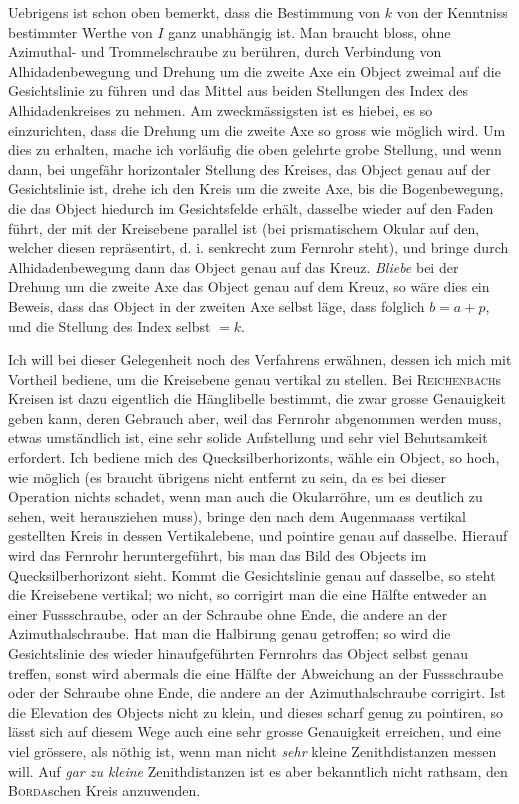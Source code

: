\par\indent Uebrigens ist schon oben bemerkt, dass die Bestimmung von $k$ von der Kenntniss bestimmter Werthe von $I$ ganz unabhängig ist. Man braucht bloss, ohne Azimuthal- und Trommelschraube zu berühren, durch Verbindung von Alhidadenbewegung und Drehung um die zweite Axe ein Object zweimal auf die Gesichtslinie zu führen und das Mittel aus beiden Stellungen des Index des Alhidadenkreises zu nehmen. Am zweckmässigsten ist es hiebei, es so einzurichten, dass die Drehung um die zweite Axe so gross wie möglich wird. Um dies zu erhalten, mache ich vorläufig die oben gelehrte grobe Stellung, und wenn dann, bei ungefähr horizontaler Stellung des Kreises, das Object genau auf der Gesichtslinie ist, drehe ich den Kreis um die zweite Axe, bis die Bogenbewegung, die das Object hiedurch im Gesichtsfelde erhält, dasselbe wieder auf den Faden führt, der mit der Kreisebene parallel ist (bei prismatischem Okular auf den, welcher diesen repräsentirt, d. i. senkrecht zum Fernrohr steht), und bringe durch Alhidadenbewegung dann das Object genau auf das Kreuz. \emph{Bliebe} bei der Drehung um die zweite Axe das Object genau auf dem Kreuz, so wäre dies ein Beweis, dass das Object in der zweiten Axe selbst läge, dass folglich $b=a+p$, und die Stellung des Index selbst $=k$.

\par\indent Ich will bei dieser Gelegenheit noch des Verfahrens erwähnen, dessen ich mich mit Vortheil bediene, um die Kreisebene genau vertikal zu stellen. Bei \textsc{Reichenbach}s Kreisen ist dazu eigentlich die Hänglibelle bestimmt, die zwar grosse Genauigkeit geben kann, deren Gebrauch aber, weil das Fernrohr abgenommen werden muss, etwas umständlich ist, eine sehr solide Aufstellung und sehr viel Behutsamkeit erfordert. Ich bediene mich des Quecksilberhorizonts, wähle ein Object, so hoch, wie möglich (es braucht übrigens nicht entfernt zu sein, da es bei dieser Operation nichts schadet, wenn man auch die Okularröhre, um es deutlich zu sehen, weit herausziehen muss), bringe den nach dem Augenmaass vertikal gestellten Kreis in dessen Vertikalebene, und pointire genau auf dasselbe. Hierauf wird das Fernrohr heruntergeführt, bis man das Bild des Objects im Quecksilberhorizont sieht. Kommt die Gesichtslinie genau auf dasselbe, so steht die Kreisebene vertikal; wo nicht, so corrigirt man die eine Hälfte entweder an einer Fussschraube, oder an der Schraube ohne Ende, die andere an der Azimuthalschraube. Hat man die Halbirung genau getroffen; so wird die Gesichtslinie des wieder hinaufgeführten Fernrohrs das Object selbst genau treffen, sonst wird abermals die eine Hälfte der Abweichung an der Fussschraube oder der Schraube ohne Ende, die andere an der Azimuthalschraube corrigirt. Ist die Elevation des Objects nicht zu klein, und dieses scharf genug zu pointiren, so lässt sich auf diesem Wege auch eine sehr grosse Genauigkeit erreichen, und eine viel grössere, als nöthig ist, wenn man nicht \emph{sehr} kleine Zenithdistanzen messen will. Auf \emph{gar zu kleine} Zenithdistanzen ist es aber bekanntlich nicht rathsam, den \textsc{Borda}schen Kreis anzuwenden.

